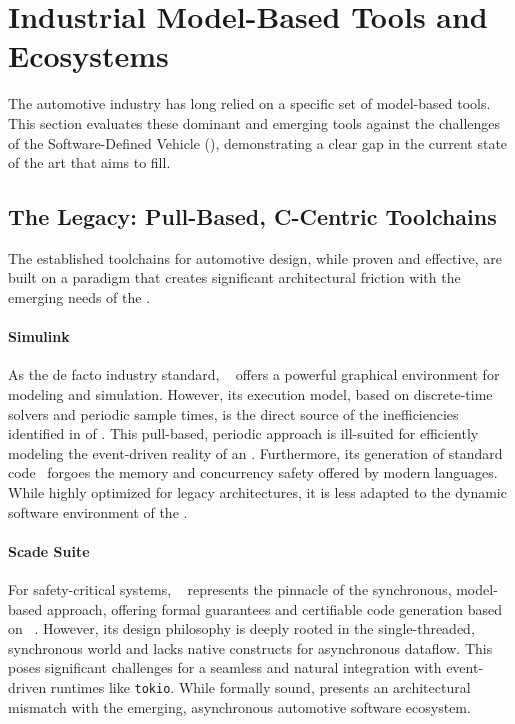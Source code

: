 \section{Industrial Model-Based Tools and Ecosystems}
\label{sec:sota:tools}

The automotive industry has long relied on a specific set of model-based tools. This section
evaluates these dominant and emerging tools against the challenges of the Software-Defined Vehicle
(\sdv), demonstrating a clear gap in the current state of the art that \GRust aims to fill.

\subsection{The Legacy: Pull-Based, C-Centric Toolchains}
\label{sec:sota:tools:legacy}

The established toolchains for automotive design, while proven and effective, are built on a
paradigm that creates significant architectural friction with the emerging needs of the \sdv.

\paragraph*{Simulink}
As the de facto industry standard, \Simulink~\cite{simulink} offers a powerful graphical
environment for modeling and simulation. However, its execution model, based on discrete-time
solvers and periodic sample times, is the direct source of the inefficiencies identified in
 of . This pull-based, periodic approach is ill-suited for efficiently modeling the
event-driven reality of an \sdv. Furthermore, its generation of standard \Ci
code~\cite{simulink_codegen,simulink_misra} forgoes the memory and concurrency safety offered by
modern languages. While highly optimized for legacy architectures, it is less adapted to the dynamic
software environment of the \sdv.

\paragraph*{Scade Suite}
For safety-critical systems, \Scade~\cite{DBLP:conf/fdl/ColacoPPP18} represents the pinnacle of the
synchronous, model-based approach, offering formal guarantees and certifiable code generation based
on \Lustre~\cite{DBLP:conf/popl/CaspiPHP87}. However, its design philosophy is deeply rooted in the
single-threaded, synchronous world and lacks native constructs for asynchronous dataflow. This poses
significant challenges for a seamless and natural integration with event-driven runtimes like
\texttt{tokio}. While formally sound, \Scade presents an architectural mismatch with the emerging,
asynchronous automotive software ecosystem.

